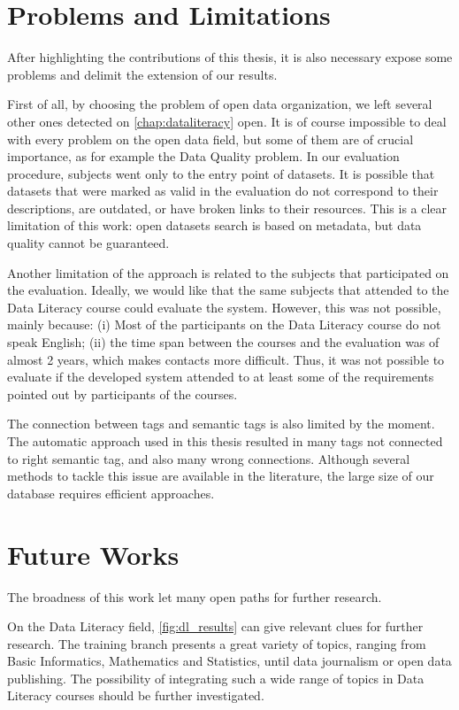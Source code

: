 \section{Problems and Limitations}

After highlighting the contributions of this thesis, it is also necessary expose some problems and delimit the extension of our results.

First of all, by choosing the problem of open data organization, we left several other ones detected on \autoref{chap:dataliteracy} open.
It is of course impossible to deal with every problem on the open data field, but some of them are of crucial importance, as for example the Data Quality problem.
In our evaluation procedure, subjects went only to the entry point of datasets.
It is possible that datasets that were marked as valid in the evaluation do not correspond to their descriptions, are outdated, or have broken links to their resources.
This is a clear limitation of this work: open datasets search is based on metadata, but data quality cannot be guaranteed.

Another limitation of the approach is related to the subjects that participated on the evaluation.
Ideally, we would like that the same subjects that attended to the Data Literacy course could evaluate the system.
However, this was not possible, mainly because: (i) Most of the participants on the Data Literacy course do not speak English; (ii) the time span between the courses and the evaluation was of almost 2 years, which makes contacts more difficult.
Thus, it was not possible to evaluate if the developed system attended to at least some of the requirements pointed out by participants of the courses.

The connection between tags and semantic tags is also limited by the moment.
The automatic approach used in this thesis resulted in many tags not connected to right semantic tag, and also many wrong connections. 
Although several methods to tackle this issue are available in the literature, the large size of our database requires efficient approaches.


\section{Future Works}

The broadness of this work let many open paths for further research.

On the Data Literacy field, \autoref{fig:dl_results} can give relevant clues for further research.
The training branch presents a great variety of topics, ranging from Basic Informatics, Mathematics and Statistics, until data journalism or open data publishing.
The possibility of integrating such a wide range of topics in Data Literacy courses should be further investigated.

